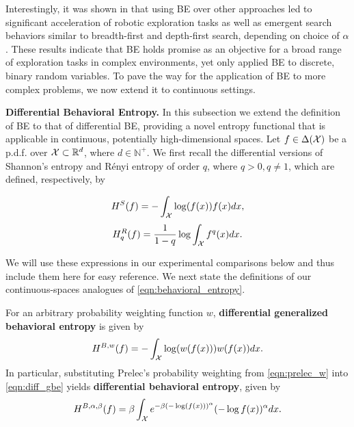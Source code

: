 Interestingly, it was shown in \citep{suresh2024robotic} that using BE over other approaches led to significant acceleration of robotic exploration tasks as well as emergent search behaviors similar to breadth-first and depth-first search, depending on choice of $\alpha$. These results indicate that BE holds promise as an objective for a broad range of exploration tasks in complex environments, yet \cite{suresh2024robotic} only applied BE to discrete, binary random variables. To pave the way for the application of BE to more complex problems, we now extend it to continuous settings.
%



\textbf{Differential Behavioral Entropy.} In this subsection we extend the definition of BE to that of differential BE, providing a novel entropy functional that is applicable in continuous, potentially high-dimensional spaces.
%
Let $f \in \Delta(\mathcal{X})$ be a p.d.f. over $\mathcal{X} \subset \mathbb{R}^d$, where $d \in \mathbb{N}^+$. We first recall the differential versions of Shannon's entropy and R\'{e}nyi entropy of order $q$, where $q > 0, q \neq 1$, which are defined, respectively, by
%
\begin{multicols}{2}
    \noindent
    \begin{equation} \label{eqn:diff_shannon}
        H^S(f) = - \int_{\mathcal{X}} \log (f(x)) f(x) dx,
    \end{equation}
    \noindent
    \begin{equation} \label{eqn:diff_renyi}
        H^R_q(f) = \frac{1}{1 - q} \log \int_{\mathcal{X}} f^q(x) dx.
    \end{equation}
\end{multicols}
%
We will use these expressions in our experimental comparisons below and thus include them here for easy reference. We next state the definitions of our continuous-spaces analogues of \eqref{eqn:behavioral_entropy}.
%
\begin{definition}
    For an arbitrary probability weighting function $w$, \textbf{differential generalized behavioral entropy} is given by
    \begin{equation} \label{eqn:diff_gbe}
        H^{B,w}(f) = - \int_{\mathcal{X}} \log(w(f(x))) w(f(x)) dx.
    \end{equation}
%
%
%
In particular, substituting Prelec's probability weighting from \eqref{eqn:prelec_w} into \eqref{eqn:diff_gbe} yields \textbf{differential behavioral entropy}, given by
%
\begin{equation} \label{eqn:diff_be}
    H^{B,\alpha,\beta}(f) = \beta \int_{\mathcal{X}} e^{-\beta ( - \log (f(x)))^{\alpha}} (-\log f(x))^{\alpha} dx.
\end{equation}
\end{definition}

